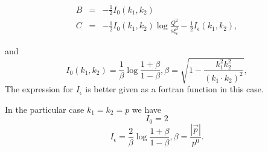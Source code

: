 \documentclass{letter}
\begin{document}
\begin{eqnarray}
  B & = & - \frac{1}{2} I_0 (k_1, k_2) \\
  C & = & - \frac{1}{2} I_0 (k_1, k_2) \log \frac{Q^2}{s \xi_c^2} -
  \frac{1}{2} I_{\epsilon} (k_1, k_2), 
\end{eqnarray}

and
\begin{equation}
  I_0 (k_1, k_2) = \frac{1}{\beta} \log \frac{1 + \beta}{1 - \beta}, \beta =
  \sqrt{1 - \frac{k_1^2 k_2^2}{(k_1 \cdot k_2)^2}},
\end{equation}
The expression for $I_{\epsilon}$ is better given as a fortran function in
this case.

In the particular case $k_1 = k_2 = p$ we have
\begin{equation}
  I_0 = 2
\end{equation}
\begin{equation}
  I_{\epsilon} = \frac{2}{\beta} \log \frac{1 + \beta}{1 - \beta}, \beta =
  \frac{| \vec{p} |}{p^0} .
\end{equation}
\end{document}
